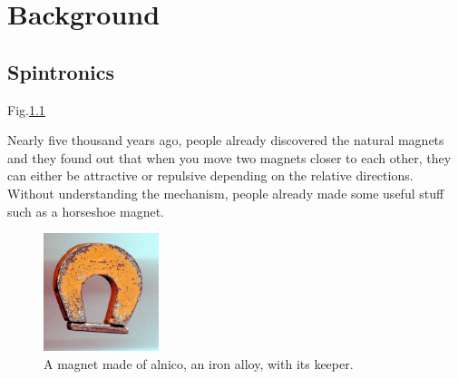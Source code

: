 \chapter{Background}

\section{Spintronics}



Fig.\ref{fig:Magnet}

Nearly five thousand years ago, people already discovered the natural magnets and they found out that when you move two magnets closer to each other, they can either be attractive or repulsive depending on the relative directions. Without understanding the mechanism, people already made some useful stuff such as a horseshoe magnet\cite{wiki:Ferromagnetism}.

\begin{figure}[!ht]
	\centering
	\includegraphics[width=0.3\textwidth]{fig/Magnet.jpg}
	\caption{A magnet made of alnico, an iron alloy, with its keeper.}\label{fig:Magnet}
\end{figure}




